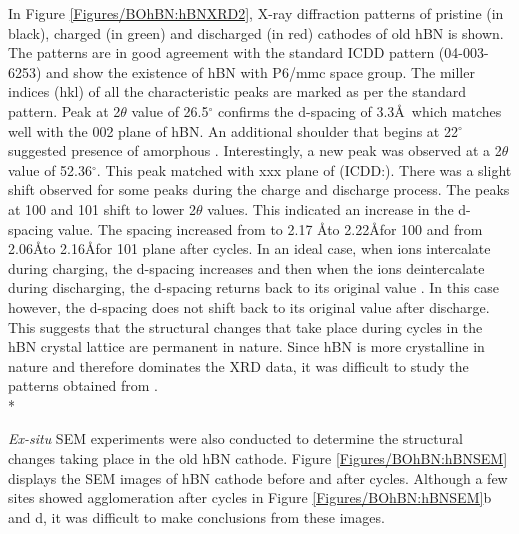 In Figure \ref{Figures/BOhBN:hBNXRD2}, X-ray diffraction patterns of pristine (in black), charged (in green) and discharged (in red) cathodes of old hBN is shown. The patterns are in good agreement with the standard ICDD pattern (04-003-6253) and show the existence of hBN with P6/mmc space group. The miller indices (hkl) of all the characteristic peaks are marked as per the standard pattern. Peak at 2$\theta$ value of 26.5$^{\circ}$ confirms the d-spacing of 3.3\AA\, which matches well with the 002 plane of hBN. An additional shoulder that begins at 22$^{\circ}$ suggested presence of amorphous . Interestingly, a new peak was observed at a 2$\theta$ value of 52.36$^{\circ}$. This peak matched with xxx plane of  (ICDD:). There was a slight shift observed for some peaks during the charge and discharge process. The peaks at 100 and 101 shift to lower 2$\theta$ values. This indicated an increase in the d-spacing value. The spacing increased from to 2.17 \AA to 2.22\AA for 100 and from 2.06\AA to 2.16\AA for 101 plane after cycles. In an ideal case, when ions intercalate during charging, the d-spacing increases and then when the ions deintercalate during discharging, the d-spacing returns back to its original value \cite{wang_advanced_2017}. In this case however, the d-spacing does not shift back to its original value after discharge. This suggests that the structural changes that take place during cycles in the hBN crystal lattice are permanent in nature. Since hBN is more crystalline in nature and therefore dominates the XRD data, it was difficult to study the patterns obtained from .  \\*

\textit{Ex-situ} SEM experiments were also conducted to determine the structural changes taking place in the old hBN cathode. Figure \ref{Figures/BOhBN:hBNSEM} displays the SEM images of hBN cathode before and after cycles. Although a few sites showed agglomeration after cycles in Figure \ref{Figures/BOhBN:hBNSEM}b and d, it was difficult to make conclusions from these images.

